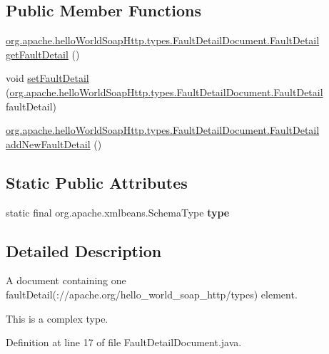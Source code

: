 \subsection*{Public Member Functions}
\begin{DoxyCompactItemize}
\item 
\hyperlink{interfaceorg_1_1apache_1_1hello_world_soap_http_1_1types_1_1_fault_detail_document_1_1_fault_detail}{org.\+apache.\+hello\+World\+Soap\+Http.\+types.\+Fault\+Detail\+Document.\+Fault\+Detail} \hyperlink{interfaceorg_1_1apache_1_1hello_world_soap_http_1_1types_1_1_fault_detail_document_aa9461a7f12f0d7d67eec8d616c55d485}{get\+Fault\+Detail} ()
\item 
void \hyperlink{interfaceorg_1_1apache_1_1hello_world_soap_http_1_1types_1_1_fault_detail_document_a2db3a02bc3400b5082f96375064f3ae8}{set\+Fault\+Detail} (\hyperlink{interfaceorg_1_1apache_1_1hello_world_soap_http_1_1types_1_1_fault_detail_document_1_1_fault_detail}{org.\+apache.\+hello\+World\+Soap\+Http.\+types.\+Fault\+Detail\+Document.\+Fault\+Detail} fault\+Detail)
\item 
\hyperlink{interfaceorg_1_1apache_1_1hello_world_soap_http_1_1types_1_1_fault_detail_document_1_1_fault_detail}{org.\+apache.\+hello\+World\+Soap\+Http.\+types.\+Fault\+Detail\+Document.\+Fault\+Detail} \hyperlink{interfaceorg_1_1apache_1_1hello_world_soap_http_1_1types_1_1_fault_detail_document_a6815c63b3fee4a9fd151a24361fec8d1}{add\+New\+Fault\+Detail} ()
\end{DoxyCompactItemize}
\subsection*{Static Public Attributes}
\begin{DoxyCompactItemize}
\item 
static final org.\+apache.\+xmlbeans.\+Schema\+Type {\bfseries type}
\end{DoxyCompactItemize}


\subsection{Detailed Description}
A document containing one fault\+Detail(\+://apache.org/hello\+\_\+world\+\_\+soap\+\_\+http/types) element.

This is a complex type. 

Definition at line 17 of file Fault\+Detail\+Document.\+java.



